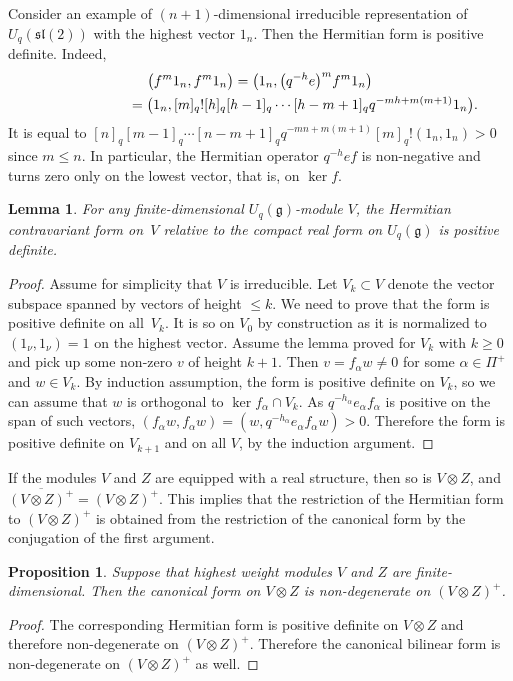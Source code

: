 \documentclass[pdftex]{sigma}
\numberwithin{equation}{section}
\newtheorem{Lemma}[Theorem]{Lemma}
\newtheorem{Proposition}[Theorem]{Proposition}
 { \theoremstyle{definition}
\newtheorem{Definition}[Theorem]{Definition}
\newtheorem{Example}[Theorem]{Example}
\newtheorem{Remark}[Theorem]{Remark} }
\begin{document}
Consider an example of $(n+1)$-dimensional irreducible representation of $U_q (\mathfrak{sl}(2) )$ with the highest vector $1_n$. Then the Hermitian form is positive definite. Indeed,
\begin{gather*}
\big(f^m 1_n, f^m 1_n\big)=\bigl(1_n, \big(q^{-h}e\big)^m f^m1_n\bigr)\\
\hphantom{\big(f^m 1_n, f^m 1_n\big)}{} =\bigl(1_n, [m]_q! [h]_q[h-1]_q\cdots [h-m+1]_qq^{-mh+m(m+1)}1_n\bigr).
\end{gather*}
It is equal to $[n]_q[m-1]_q\cdots [n-m+1]_qq^{-mn+m(m+1)}[m]_q! (1_n,1_n)>0$ since $m\leqslant n$. In particular, the Hermitian operator $q^{-h}e f$ is non-negative and turns zero only on the lowest vector, that is, on $\ker f$.
\begin{Lemma} For any finite-dimensional $U_q(\mathfrak{g})$-module $V$, the Hermitian contravariant form on~$V$ relative to the compact real form on $U_q(\mathfrak{g})$ is positive definite.
\end{Lemma}
\begin{proof}Assume for simplicity that $V$ is irreducible. Let $V_k\subset V$ denote the vector subspace spanned by vectors of height $\leqslant k$. We need to prove that the form is positive definite on all~$V_k$. It is so on $V_0$ by construction as it is normalized to $(1_\nu,1_\nu)=1$ on the highest vector. Assume the lemma proved for $V_k$ with $k\geqslant 0$ and pick up some non-zero $v$ of height $k+1$. Then $v=f_\alpha w\not =0$ for some $\alpha \in \Pi^+$ and $w\in V_k$. By induction assumption, the form is positive definite on $V_k$, so we can assume that $w$ is orthogonal to $\ker f_\alpha\cap V_{k}$. As $q^{-h_\alpha}e_\alpha f_\alpha$ is positive on the span of such vectors, $(f_\alpha w,f_\alpha w)=(w, q^{-h_\alpha}e_\alpha f_\alpha w)>0$. Therefore the form is positive definite on $V_{k+1}$ and on all $V$, by the induction argument.
\end{proof}

If the modules $V$ and $Z$ are equipped with a real structure, then so is $V\otimes Z$, and $\overline{(V\otimes Z)^+}=(V\otimes Z)^+$. This implies that the restriction of the Hermitian form to $(V\otimes Z)^+$ is obtained from the restriction of the canonical form by the conjugation of the first argument.
\begin{Proposition}Suppose that highest weight modules $V$ and $Z$ are finite-dimensional. Then the canonical form on $V\otimes Z$ is non-degenerate on $(V\otimes Z)^+$.
\end{Proposition}
\begin{proof} The corresponding Hermitian form is positive definite on $V\otimes Z$ and therefore non-degenerate on $(V\otimes Z)^+$. Therefore the canonical bilinear form is non-degenerate on $(V\otimes Z)^+$ as well.
\end{proof}
\end{document}
